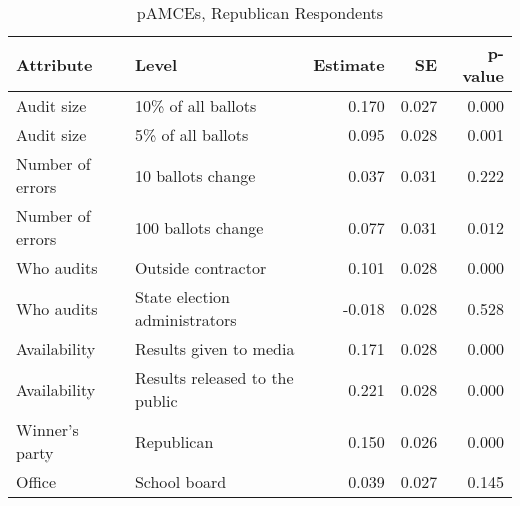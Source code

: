 \begin{table}[!h]

\caption{pAMCEs, Republican Respondents}
\centering
\begin{tabular}[t]{llrrr}
\toprule
Attribute & Level & Estimate & SE & p-value\\
\midrule
Audit size & 10\% of all ballots & 0.170 & 0.027 & 0.000\\
Audit size & 5\% of all ballots & 0.095 & 0.028 & 0.001\\
Number of errors & 10 ballots change & 0.037 & 0.031 & 0.222\\
Number of errors & 100 ballots change & 0.077 & 0.031 & 0.012\\
Who audits & Outside contractor & 0.101 & 0.028 & 0.000\\
\addlinespace
Who audits & State election administrators & -0.018 & 0.028 & 0.528\\
Availability & Results given to media & 0.171 & 0.028 & 0.000\\
Availability & Results released to the public & 0.221 & 0.028 & 0.000\\
Winner's party & Republican & 0.150 & 0.026 & 0.000\\
Office & School board & 0.039 & 0.027 & 0.145\\
\bottomrule
\end{tabular}
\end{table}
